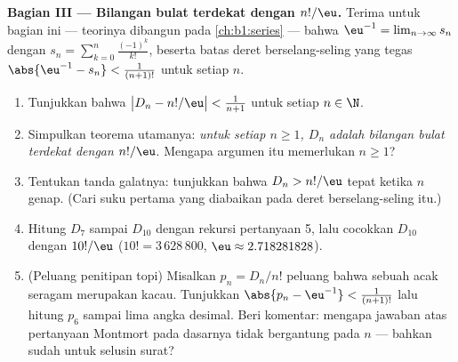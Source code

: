\begin{problem}
\medskip
\noindent\textbf{Bagian III --- Bilangan bulat terdekat dengan
$n!/\eu$.} Terima untuk bagian ini --- teorinya dibangun pada
\cref{ch:b1:series} --- bahwa
$\eu^{-1} = \lim_{n \to \infty} s_n$ dengan $s_n = \sum_{k=0}^{n}
\frac{(-1)^k}{k!}$, beserta batas deret berselang-seling yang tegas
$\abs{\eu^{-1} - s_n} < \frac1{(n+1)!}$ untuk setiap $n$.
\begin{enumerate}[resume]
  \item Tunjukkan bahwa $\bigl| D_n - n!/\eu \bigr| < \frac1{n+1}$ untuk
        setiap $n \in \N$.
  \item Simpulkan teorema utamanya: \emph{untuk setiap $n \geq 1$,
        $D_n$ adalah bilangan bulat terdekat dengan $n!/\eu$}. Mengapa
        argumen itu memerlukan $n \geq 1$?
  \item Tentukan tanda galatnya: tunjukkan bahwa $D_n > n!/\eu$
        tepat ketika $n$ genap. (Cari suku pertama yang diabaikan
        pada deret berselang-seling itu.)
  \item Hitung $D_7$ sampai $D_{10}$ dengan rekursi
        pertanyaan 5, lalu cocokkan $D_{10}$ dengan $10!/\eu$
        ($10! = 3\,628\,800$, $\eu \approx 2.718281828$).
  \item (Peluang penitipan topi) Misalkan $p_n = D_n/n!$ peluang
        bahwa sebuah  acak seragam merupakan
         kacau. Tunjukkan $\abs{p_n - \eu^{-1}} < \frac1{(n+1)!}$
        lalu hitung $p_6$ sampai lima angka desimal. Beri komentar: mengapa
        jawaban atas pertanyaan Montmort pada dasarnya tidak bergantung
        pada $n$ --- bahkan sudah untuk selusin surat?
\end{enumerate}


\end{problem}
